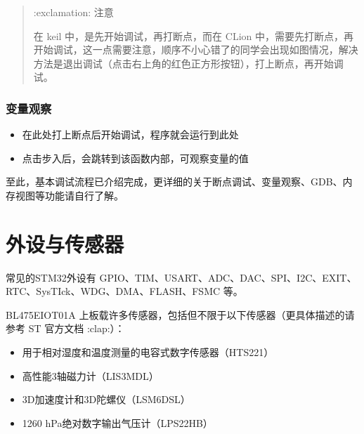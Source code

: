 \documentclass[a4paper,12pt,english]{sphinxmanual}
\begin{document}
\sphinxAtStartPar
{}

\sphinxAtStartPar
{}
\begin{quote}

\sphinxAtStartPar
:exclamation: 注意

\sphinxAtStartPar
在 keil 中，是先开始调试，再打断点，而在 CLion 中，需要先打断点，再开始调试，这一点需要注意，顺序不小心错了的同学会出现如图情况，解决方法是退出调试（点击右上角的红色正方形按钮），打上断点，再开始调试。

\sphinxAtStartPar
{}
\end{quote}


\subsubsection{变量观察}
\label{\detokenize{exp-stm32/debug-flow:id9}}\begin{itemize}
\item {} 
\sphinxAtStartPar
在此处打上断点后开始调试，程序就会运行到此处

\end{itemize}

\sphinxAtStartPar
{}
\begin{itemize}
\item {} 
\sphinxAtStartPar
点击步入后，会跳转到该函数内部，可观察变量的值

\end{itemize}

\sphinxAtStartPar
{}

\sphinxAtStartPar
至此，基本调试流程已介绍完成，更详细的关于断点调试、变量观察、GDB、内存视图等功能请自行了解。

\sphinxstepscope


\section{外设与传感器}
\label{\detokenize{exp-stm32/peripherals-and-sensors:id1}}\label{\detokenize{exp-stm32/peripherals-and-sensors::doc}}
\sphinxAtStartPar
常见的STM32外设有 GPIO、TIM、USART、ADC、DAC、SPI、I2C、EXIT、RTC、SysTIck、WDG、DMA、FLASH、FSMC 等。

\sphinxAtStartPar
B\sphinxhyphen{}L475E\sphinxhyphen{}IOT01A 上板载许多传感器，包括但不限于以下传感器（更具体描述的请参考 ST 官方文档 :clap:）：
\begin{itemize}
\item {} 
\sphinxAtStartPar
用于相对湿度和温度测量的电容式数字传感器（HTS221）

\item {} 
\sphinxAtStartPar
高性能3轴磁力计（LIS3MDL）

\item {} 
\sphinxAtStartPar
3D加速度计和3D陀螺仪（LSM6DSL）

\item {} 
\sphinxhyphen{}1260 hPa绝对数字输出气压计（LPS22HB）

\end{itemize}
\end{document}
